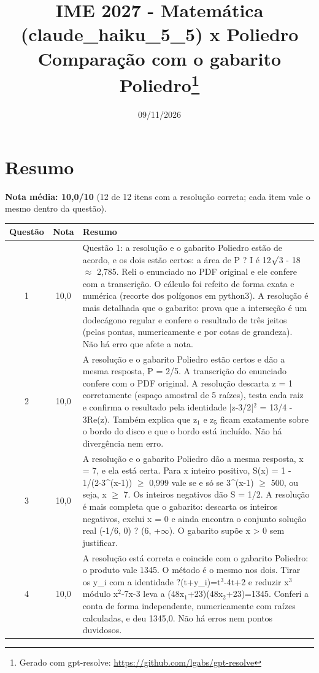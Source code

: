 \documentclass{article}%
\title{IME 2027 {-} Matemática (claude\_haiku\_5\_5) x Poliedro\\[4pt]\large Comparação com o gabarito Poliedro\thanks{Gerado com gpt-resolve: \url{https://github.com/lgabs/gpt-resolve}}}%
\date{09/11/2026}%
\begin{document}
%
\normalsize%
\maketitle%
\section*{Resumo}\textbf{Nota média: 10,0/10} (12 de 12 itens com a resolução correta; cada item vale o mesmo dentro da questão).\par\medskip%
\begin{longtable}{@{}c c p{}@{}}\toprule Questão & Nota & Resumo \\ \midrule
1 & 10,0 & Questão 1: a resolução e o gabarito Poliedro estão de acordo, e os dois estão certos: a área de P ? I é 12$\surd$3 - 18 $\approx$ 2,785. Reli o enunciado no PDF original e ele confere com a transcrição. O cálculo foi refeito de forma exata e numérica (recorte dos polígonos em python3). A resolução é mais detalhada que o gabarito: prova que a interseção é um dodecágono regular e confere o resultado de três jeitos (pelas pontas, numericamente e por cotas de grandeza). Não há erro que afete a nota. \\
2 & 10,0 & A resolução e o gabarito Poliedro estão certos e dão a mesma resposta, P = 2/5. A transcrição do enunciado confere com o PDF original. A resolução descarta z = 1 corretamente (espaço amostral de 5 raízes), testa cada raiz e confirma o resultado pela identidade |z-3/2|$^2$ = 13/4 - 3Re(z). Também explica que z$_{1}$ e z$_{5}$ ficam exatamente sobre o bordo do disco e que o bordo está incluído. Não há divergência nem erro. \\
3 & 10,0 & A resolução e o gabarito Poliedro dão a mesma resposta, x = 7, e ela está certa. Para x inteiro positivo, S(x) = 1 - 1/(2$\cdot$3\^{}(x-1)) $\geq$ 0,999 vale se e só se 3\^{}(x-1) $\geq$ 500, ou seja, x $\geq$ 7. Os inteiros negativos dão S = 1/2. A resolução é mais completa que o gabarito: descarta os inteiros negativos, exclui x = 0 e ainda encontra o conjunto solução real (-1/6, 0) ? (6, +$\infty$). O gabarito supõe x > 0 sem justificar. \\
4 & 10,0 & A resolução está correta e coincide com o gabarito Poliedro: o produto vale 1345. O método é o mesmo nos dois. Tirar os y\_i com a identidade ?(t+y\_i)=t$^3$-4t+2 e reduzir x$^3$ módulo x$^2$-7x-3 leva a (48x$_{1}$+23)(48x$_{2}$+23)=1345. Conferi a conta de forma independente, numericamente com raízes calculadas, e deu 1345,0. Não há erros nem pontos duvidosos. \\

\end{longtable}
\end{document}
